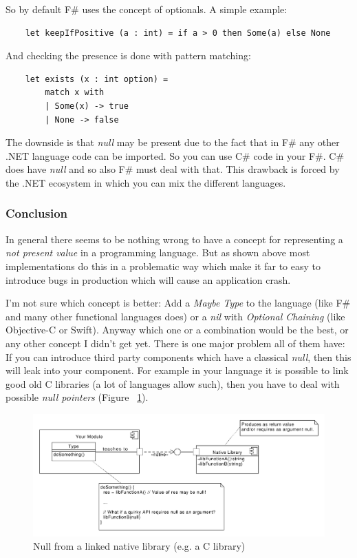 \documentclass[12pt,a4paper]{report}
\begin{document}
\noindent
So by default F\# uses the concept of optionals\cite{optional-in-fsharp}. A simple example:

\begin{verbatim}
    let keepIfPositive (a : int) = if a > 0 then Some(a) else None
\end{verbatim}

And checking the presence is done with pattern matching:

\begin{verbatim}
    let exists (x : int option) =
        match x with
        | Some(x) -> true
        | None -> false
\end{verbatim}

The downside is that \textit{null} may be present due to the fact that in F\# any other .NET language code can be imported. So you can use C\# code in your F\#. C\# does have \textit{null} and so also F\# must deal with that. This drawback is forced by the .NET ecosystem in which you can mix the different languages.

\subsubsection{Conclusion}

In general there seems to be nothing wrong to have a concept for representing a \textit{not present value} in a programming language. But as shown above most implementations do this in a problematic way which make it far to easy to introduce bugs in production which will cause an application crash.

I'm not sure which concept is better: Add a \textit{Maybe Type} to the language (like F\# and many other functional languages does) or a \textit{nil} with \textit{Optional Chaining} (like Objective-C or Swift). Anyway which one or a combination would be the best, or any other concept I didn't get yet. There is one major problem all of them have: If you can introduce third party components which have a classical \textit{null}, then this will leak into your component. For example in your language it is possible to link good old C libraries (a lot of languages allow such), then you have to deal with possible \textit{null pointers} (Figure ~\ref{fig:Null_from_linked_native_libs}). 

\begin{figure}[ht]
	\centering
    \includegraphics[width=350pt]{grafics/Null_from_linked_native_libs.pdf}
    \caption{Null from a linked native library (e.g. a C library)}
    \label{fig:Null_from_linked_native_libs}
\end{figure}
\end{document}
